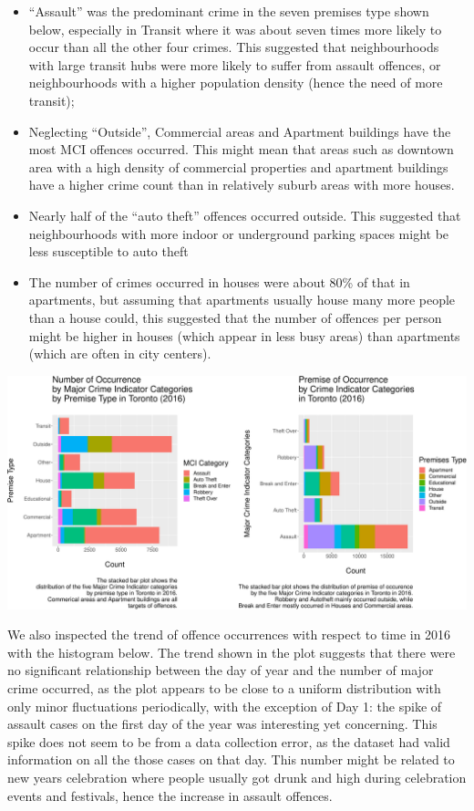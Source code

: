 \documentclass[
]{article}
\begin{document}
\begin{itemize}
\item
  ``Assault'' was the predominant crime in the seven premises type shown
  below, especially in Transit where it was about seven times more
  likely to occur than all the other four crimes. This suggested that
  neighbourhoods with large transit hubs were more likely to suffer from
  assault offences, or neighbourhoods with a higher population density
  (hence the need of more transit);
\item
  Neglecting ``Outside'', Commercial areas and Apartment buildings have
  the most MCI offences occurred. This might mean that areas such as
  downtown area with a high density of commercial properties and
  apartment buildings have a higher crime count than in relatively
  suburb areas with more houses.
\item
  Nearly half of the ``auto theft'' offences occurred outside. This
  suggested that neighbourhoods with more indoor or underground parking
  spaces might be less susceptible to auto theft
\item
  The number of crimes occurred in houses were about 80\% of that in
  apartments, but assuming that apartments usually house many more
  people than a house could, this suggested that the number of offences
  per person might be higher in houses (which appear in less busy areas)
  than apartments (which are often in city centers).
\end{itemize}

\includegraphics{Final-Report_files/figure-latex/crime-count-by-premise-1.pdf}

We also inspected the trend of offence occurrences with respect to time
in 2016 with the histogram below. The trend shown in the plot suggests
that there were no significant relationship between the day of year and
the number of major crime occurred, as the plot appears to be close to a
uniform distribution with only minor fluctuations periodically, with the
exception of Day 1: the spike of assault cases on the first day of the
year was interesting yet concerning. This spike does not seem to be from
a data collection error, as the dataset had valid information on all the
those cases on that day. This number might be related to new years
celebration where people usually got drunk and high during celebration
events and festivals, hence the increase in assault offences.
\end{document}
